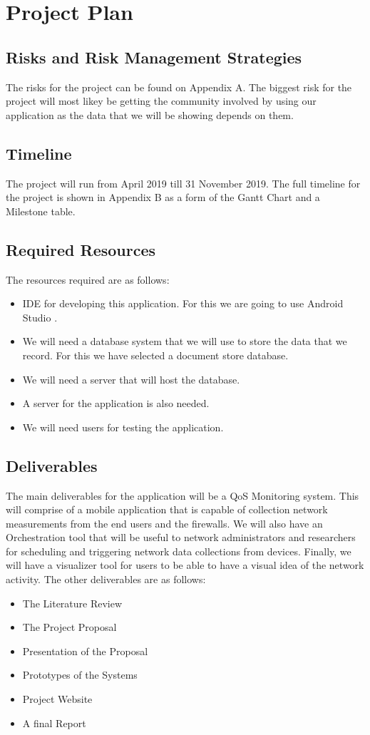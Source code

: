 \section{Project Plan}
\subsection{Risks and Risk Management Strategies}
The risks for the project can be found on Appendix A. The biggest risk for the project will most likey be getting the community involved by using our application as the data that we will be showing depends on them.
\subsection{Timeline}
The project will run from April 2019 till 31 November 2019. The full timeline for the project is shown in Appendix B as a form of the Gantt Chart and a Milestone table.
\subsection{Required Resources}
The resources required are as follows:
\begin{itemize}
	\item IDE for developing this application. For this we are going to use Android Studio \cite{android_developers}.
	\item  We will need a database system that we will use to store the data that we record. For this we have selected a document store database.
	\item We will need a server that will host the database.
	\item A server for the application is also needed.
	\item We will need users for testing the application.
\end{itemize}
\subsection{Deliverables}
The main deliverables for the application will be a QoS Monitoring system. This will comprise of a mobile application that is capable of collection network measurements from the end users and the firewalls. We will also have an Orchestration tool that will be useful to network administrators and researchers for scheduling and triggering network data collections from devices. Finally, we will have a visualizer tool for users to be able to have a visual idea of the network activity. The other deliverables are as follows:
\begin{itemize}
	\item The Literature Review
	\item The Project Proposal
	\item Presentation of the Proposal
	\item Prototypes of the Systems
	\item Project Website
	\item A final Report
\end{itemize}
